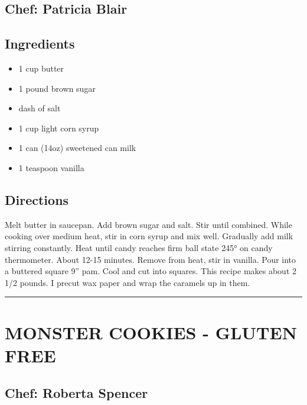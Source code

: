 \documentclass[
]{book}
\providecommand{\tightlist}{%
  \setlength{\itemsep}{0pt}\setlength{\parskip}{0pt}}
\begin{document}
\hypertarget{chef-patricia-blair-16}{%
\subsection*{Chef: Patricia Blair}\label{chef-patricia-blair-16}}


\hypertarget{ingredients-98}{%
\subsection*{Ingredients}\label{ingredients-98}}


\begin{itemize}
\tightlist
\item
  1 cup butter
\item
  1 pound brown sugar
\item
  dash of salt
\item
  1 cup light corn syrup\\
\item
  1 can (14oz) sweetened can milk
\item
  1 teaspoon vanilla
\end{itemize}

\hypertarget{directions-98}{%
\subsection*{Directions}\label{directions-98}}


Melt butter in saucepan. Add brown sugar and salt. Stir until combined. While cooking over medium heat, stir in corn syrup and mix well. Gradually add milk stirring constantly. Heat until candy reaches firm ball state 245° on candy thermometer. About 12-15 minutes. Remove from heat, stir in vanilla. Pour into a buttered square 9'' pam. Cool and cut into squares. This recipe makes about 2 1/2 pounds. I precut wax paper and wrap the caramels up in them.

\begin{center}\rule{0.5\linewidth}{0.5pt}\end{center}

\hypertarget{monster-cookies---gluten-free}{%
\section*{MONSTER COOKIES - GLUTEN FREE}\label{monster-cookies---gluten-free}}


\hypertarget{chef-roberta-spencer-35}{%
\subsection*{Chef: Roberta Spencer}\label{chef-roberta-spencer-35}}
\end{document}
